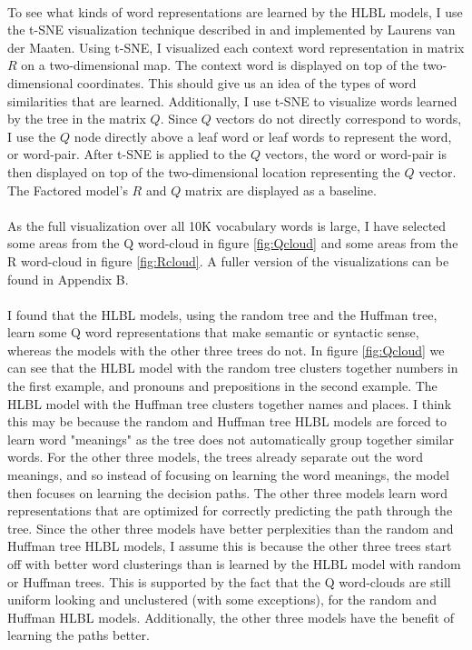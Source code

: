 \paragraph{}
To see what kinds of word representations are learned by the HLBL models, I use the t-SNE visualization technique described in \cite{Maaten2008} and implemented by Laurens van der Maaten. Using t-SNE, I visualized each context word representation in matrix $R$ on a two-dimensional map. The context word is displayed on top of the two-dimensional coordinates. This should give us an idea of the types of word similarities that are learned. Additionally, I use t-SNE to visualize words learned by the tree in the matrix $Q$. Since $Q$ vectors do not directly correspond to words, I use the $Q$ node directly above a leaf word or leaf words to represent the word, or word-pair. After t-SNE is applied to the $Q$ vectors, the word or word-pair is then displayed on top of the two-dimensional location representing the $Q$ vector. The Factored model's $R$ and $Q$ matrix are displayed as a baseline.
\paragraph{}
As the full visualization over all 10K vocabulary words is large, I have selected some areas from the Q word-cloud in figure \ref{fig:Qcloud} and some areas from the R word-cloud in figure \ref{fig:Rcloud}. A fuller version of the visualizations can be found in Appendix B. 
\paragraph{}
I found that the HLBL models, using the random tree and the Huffman tree, learn some Q word representations that make semantic or syntactic sense, whereas the models with the other three trees do not. In figure \ref{fig:Qcloud} we can see that the HLBL model with the random tree clusters together numbers in the first example, and pronouns and prepositions in the second example. The HLBL model with the Huffman tree clusters together names and places. I think this may be because the random and Huffman tree HLBL models are forced to learn word "meanings" as the tree does not automatically group together similar words. For the other three models, the trees already separate out the word meanings, and so instead of focusing on learning the word meanings, the model then focuses on learning the decision paths. The other three models learn word representations that are optimized for correctly predicting the path through the tree. Since the other three models have better perplexities than the random and Huffman tree HLBL models, I assume this is because the other three trees start off with better word clusterings than is learned by the HLBL model with random or Huffman trees. This is supported by the fact that the Q word-clouds are still uniform looking and unclustered (with some exceptions), for the random and Huffman HLBL models. Additionally, the other three models have the benefit of learning the paths better.
